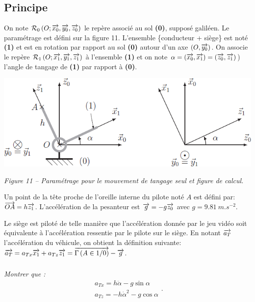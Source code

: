 \documentclass[10pt,fleqn]{article} %
\begin{document}
\subsection{Principe}
On note $\mathcal{R}_{0}\left(O;\overrightarrow{x_0},\overrightarrow{y_0},\overrightarrow{z_0} \right)$ le repère associé au sol \textbf{(0)}, supposé galiléen. Le paramétrage est défini sur la figure 11. L'ensemble \{conducteur + siège\} est noté \textbf{(1)} et est en rotation par rapport au sol \textbf{(0)} autour d'un axe $\left(O,\overrightarrow{y_0}\right)$. 
On associe le repère $\mathcal{R}_{1}\left(O;\overrightarrow{x_1},\overrightarrow{y_1},\overrightarrow{z_1} \right)$ à l'ensemble 
\textbf{(1)} et on note $\alpha =\left(\overrightarrow{x_0},\overrightarrow{x_1}\right) =\left(\overrightarrow{z_0},\overrightarrow{z_1}\right) $) l'angle de tangage de \textbf{(1)} par rapport à \textbf{(0)}. 


\begin{center}
\includegraphics[width=.9\linewidth]{images/fig_11}

\textit{Figure 11 -- Paramétrage pour le mouvement de tangage seul et figure de calcul.}
\end{center}


Un point de la tête proche de l'oreille interne du pilote noté $A$ est défini par: $\overrightarrow{OA} = h\overrightarrow{z_1}$. L'accélération de la pesanteur est $\overrightarrow{g} = -g\overrightarrow{z_0}$ avec $g = \SI{9,81}{m.s^{-2}}$. 

Le siège est piloté de telle manière que l'accélération donnée par le jeu vidéo soit équivalente à l'accélération ressentie par le pilote sur le siège. En notant $\overrightarrow{a_T}$ l'accélération du véhicule, on obtient la définition suivante: 
$\overrightarrow{a_T}=a_{Tx} \overrightarrow{x_1}+a_{Tz} \overrightarrow{z_1}=\overrightarrow{\Gamma \left( {A} \in {1}/{0}\right)}-\overrightarrow{g}$.



\subparagraph{}
\textit{Montrer que : $$ \begin{array}{l}a_{Tx}=h\ddot{\alpha} - g \sin \alpha \\a_{Tz}=-h\dot{\alpha}^2 - g \cos\alpha \end{array}.$$}

\ifprof
\begin{corrige}
\end{corrige}
\else
\fi
\end{document}
